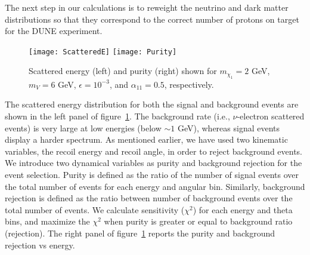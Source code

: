     The next step in our calculations is to reweight the neutrino and dark
matter distributions so that they correspond to the correct number of protons
on target for the DUNE experiment. 
 \begin{figure}[!h]
 \centering
 \texttt{[image: ScatteredE]}
 \texttt{[image: Purity]}
 \caption{\label{fig:scatter_E} Scattered energy (left) and purity (right) shown for $m_{\chi_1}=2$ GeV, $m_{V}=6$ GeV, $\epsilon=10^{-3}$, and $\alpha_{11}=0.5$, respectively. }
 \end{figure}
The scattered energy distribution for both the signal and background events are shown in the left panel of figure~\ref{fig:scatter_E}.
The background rate (i.e., $\nu$-electron scattered events) is very large at low energies (below $\sim 1$ GeV), whereas signal events display a harder spectrum. 
As mentioned earlier, we have used two kinematic variables, the recoil energy and recoil angle, in order to reject background events. 
We introduce two dynamical variables as purity and background rejection for the event selection. 
Purity is defined as the ratio of the number of signal events over the total number of events for each energy and angular bin. 
Similarly, background rejection is defined as the ratio between number of background events over the total number of events. 
We calculate sensitivity ($\chi^{2}$) for each energy and theta bins, and maximize the $\chi^{2}$ when purity is greater or equal to background ratio (rejection). The right panel of figure~\ref{fig:scatter_E} reports the purity and background rejection vs energy.
